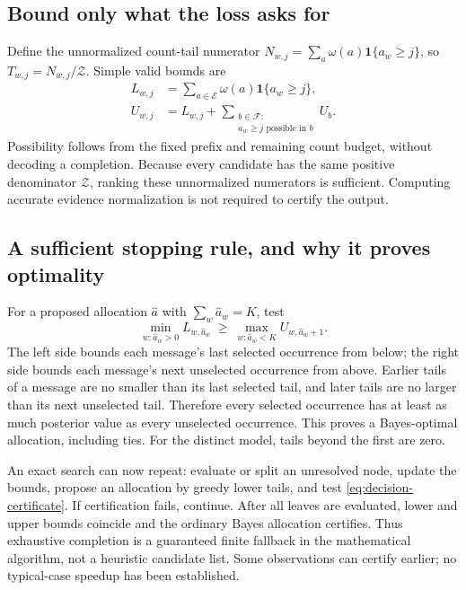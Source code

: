 \documentclass[10pt,a4paper]{article}
\newcommand{\ind}{\mathbf 1}
\begin{document}
\subsection{Bound only what the loss asks for}
Define the unnormalized count-tail numerator
$N_{w,j}=\sum_a\omega(a)\ind\{a_w\geq j\}$, so $T_{w,j}=N_{w,j}/\mathcal Z$.
Simple valid bounds are
\begin{align}
 L_{w,j}&=\sum_{a\in\mathcal E}\omega(a)\ind\{a_w\geq j\},\\
 U_{w,j}&=L_{w,j}
     +\sum_{\substack{b\in\mathcal F:\\a_w\geq j\text{ possible in }b}}U_b .
 \label{eq:tail-bounds}
\end{align}
Possibility follows from the fixed prefix and remaining count budget, without decoding a completion.
Because every candidate has the same positive denominator $\mathcal Z$, ranking these unnormalized
numerators is sufficient. Computing accurate evidence normalization is not required to certify the output.

\clearpage
\subsection{A sufficient stopping rule, and why it proves optimality}
For a proposed allocation $\widehat a$ with $\sum_w\widehat a_w=K$, test
\begin{equation}
 \boxed{\min_{w:\widehat a_w>0}L_{w,\widehat a_w}
 \ \geq\
 \max_{w:\widehat a_w<K}U_{w,\widehat a_w+1}.}
 \label{eq:decision-certificate}
\end{equation}
The left side bounds each message's last selected occurrence from below; the right side bounds each message's
next unselected occurrence from above. Earlier tails of a message are no smaller than its last selected tail,
and later tails are no larger than its next unselected tail. Therefore every selected occurrence has at least
as much posterior value as every unselected occurrence. This proves a Bayes-optimal allocation, including ties.
For the distinct model, tails beyond the first are zero.

An exact search can now repeat: evaluate or split an unresolved node, update the bounds, propose an allocation
by greedy lower tails, and test \eqref{eq:decision-certificate}. If certification fails, continue.
After all leaves are evaluated, lower and upper bounds coincide and the ordinary Bayes allocation certifies.
Thus exhaustive completion is a guaranteed finite fallback in the mathematical algorithm, not a heuristic
candidate list. Some observations can certify earlier; no typical-case speedup has been established.
\end{document}
